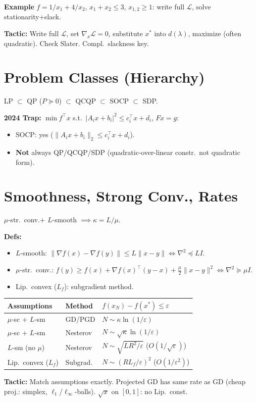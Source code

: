 \textbf{Example} \(f=1/x_1+4/x_2\), \(x_1+x_2\le3\),
\(x_{1,2}\ge1\): write full \(\mathcal L\), solve stationarity+slack.

\textbf{Tactic:} Write full \(\mathcal L\), set \(\nabla_x\mathcal
L=0\), substitute \(x^*\) into \(d(\lambda)\), maximize (often
quadratic). Check Slater. Compl.\ slackness key.

\section*{Problem Classes (Hierarchy)}
LP \(\subset\) QP (\(P\succeq0\)) \(\subset\) QCQP \(\subset\) SOCP
\(\subset\) SDP.

\textbf{2024 Trap:} \(\min f^\top x\) s.t.\ \(|A_ix+b_i|^2\le
c_i^\top x+d_i\), \(Fx=g\):
\begin{itemize}[leftmargin=*,itemsep=-1pt]
  \item SOCP: yes (\(\|A_ix+b_i\|_2\le c_i^\top x + d_i\)).
  \item \textbf{Not} always QP/QCQP/SDP (quadratic-over-linear
    constr.\ not quadratic form).
\end{itemize}

\section*{Smoothness, Strong Conv., Rates}
\(\mu\)-str.\ conv.\(+\) \(L\)-smooth \(\implies\kappa=L/\mu\).

\textbf{Defs:}
\begin{itemize}[leftmargin=*,itemsep=-1pt]
  \item \(L\)-smooth: \(\|\nabla f(x)-\nabla f(y)\|\le
    L\|x-y\|\iff\nabla^2\preceq LI\).
  \item \(\mu\)-str.\ conv.: \(f(y)\ge f(x)+\nabla
    f(x)^\top(y-x)+\frac\mu2\|x-y\|^2\iff\nabla^2\succeq\mu I\).
  \item Lip.\ convex (\(L_f\)): subgradient method.
\end{itemize}

\begin{table}[H]
  \footnotesize
  \begin{tabular}{@{}lll@{}}
    \toprule
    \textbf{Assumptions} & \textbf{Method} &
    \textbf{\(f(x_N)-f(x^*)\le\varepsilon\)} \\ \midrule
    \(\mu\)-sc + \(L\)-sm & GD/PGD & \(N\sim\kappa\ln(1/\varepsilon)\) \\
    \(\mu\)-sc + \(L\)-sm & Nesterov &
    \(N\sim\sqrt{\kappa}\ln(1/\varepsilon)\) \\
    \(L\)-sm (no \(\mu\)) & Nesterov &
    \(N\sim\sqrt{LR^2/\varepsilon}\) (\(O(1/\sqrt{\varepsilon})\)) \\
    Lip.\ convex (\(L_f\)) & Subgrad. & \(N\sim(RL_f/\varepsilon)^2\)
    (\(O(1/\varepsilon^2)\)) \\
    \bottomrule
  \end{tabular}
\end{table}
\textbf{Tactic:} Match assumptions exactly. Projected GD has same
rate as GD (cheap proj.: simplex, \(\ell_1\)/\(\ell_\infty\)-balls).
\(\sqrt{x}\) on \([0,1]\): no Lip.\ const.

